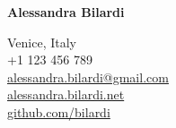 \documentclass[9pt]{stackoverflow} %
\begin{document}

\begin{minipage}[t]{0.7\textwidth} %
	\vspace{-\baselineskip} %
	
	{\HUGE\textcolor{stackoverflow-name}{\textbf{Alessandra Bilardi}}} %
	{\HUGE\textcolor{stackoverflow-name}{\textbf{}}} %

\end{minipage}
\begin{minipage}[t]{0.3\textwidth} %
	\vspace{-\baselineskip} %
	\begin{flushright}
		{Venice, Italy}\\
		{+1 123 456 789}\\
		{\href{mailto:alessandra.bilardi@gmail.com}{alessandra.bilardi@gmail.com}}\\	
		{\href{https://alessandra.bilardi.net}{alessandra.bilardi.net}}\\
		{\href{https://github.com/bilardi}{github.com/bilardi}}\\
	\end{flushright}
\end{minipage}

\end{document}
